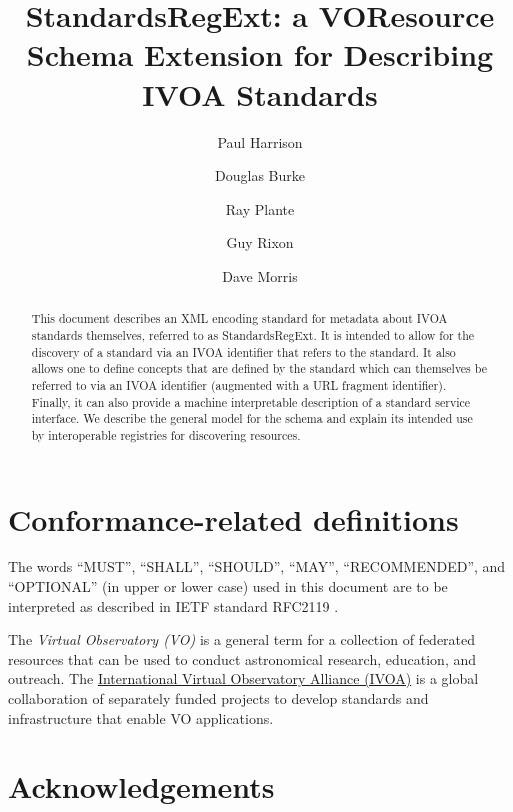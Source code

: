 \documentclass[11pt,a4paper]{ivoa}
\author[http://www.ivoa.net/twiki/bin/view/IVOA/PaulHarrison]{Paul Harrison}
\author[http://www.ivoa.net/twiki/bin/view/IVOA/DougBurke]{Douglas Burke}
\author[http://www.ivoa.net/twiki/bin/view/IVOA/RayPlante]{Ray Plante}
\author[http://www.ivoa.net/twiki/bin/view/IVOA/GuyRixon]{Guy Rixon}
\author[http://www.ivoa.net/twiki/bin/view/IVOA/DaveMorris]{Dave Morris}
\title{StandardsRegExt: a VOResource Schema Extension for Describing
IVOA Standards}
\begin{document}
\begin{abstract}
This document describes an XML encoding standard for metadata about
IVOA standards themselves, referred to as StandardsRegExt.  It is intended
to allow for the discovery of a standard via an IVOA identifier that
refers to the standard.  It also allows one to define concepts that
are defined by the standard which can themselves be referred to via an
IVOA identifier (augmented with a URL fragment identifier).  Finally,
it can also provide a machine interpretable description of a standard
service interface.  We describe the general model for the schema and
explain its intended use by interoperable registries for discovering
resources.
\end{abstract}


\section*{Conformance-related definitions}

The words ``MUST'', ``SHALL'', ``SHOULD'', ``MAY'', ``RECOMMENDED'', and
``OPTIONAL'' (in upper or lower case) used in this document are to be
interpreted as described in IETF standard RFC2119 \citep{std:RFC2119}.

The \emph{Virtual Observatory (VO)} is a
general term for a collection of federated resources that can be used
to conduct astronomical research, education, and outreach.
The \href{https://www.ivoa.net}{International
Virtual Observatory Alliance (IVOA)} is a global
collaboration of separately funded projects to develop standards and
infrastructure that enable VO applications.

\section*{Acknowledgements}
\end{document}
